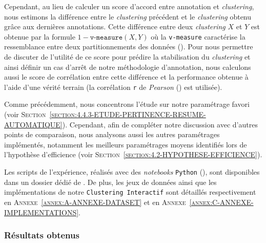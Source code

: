 			Cependant, au lieu de calculer un score d'accord entre annotation et \textit{clustering}, nous estimons la différence entre le \textit{clustering} précédent et le \textit{clustering} obtenu grâce aux dernières annotations.
			Cette différence entre deux \textit{clustering} $X$ et $Y$ est obtenue par la formule $1-\texttt{v-measure}(X,Y)$ où la \texttt{v-measure} caractérise la ressemblance entre deux partitionnements des données (\cite{rosenberg-hirschberg:2007:vmeasure-conditional-entropybased}).
			Pour nous permettre de discuter de l'utilité de ce score pour prédire la stabilisation du \textit{clustering} et ainsi définir un cas d'arrêt de notre méthodologie d'annotation, nous calculons aussi le score de corrélation entre cette différence et la performance obtenue à l'aide d'une vérité terrain (la corrélation \texttt{r} de \textit{Pearson} (\cite{kirch:2008:pearson-correlation-coefficient}) est utilisée).
			
			\begin{leftBarIdea}
				Comme précédemment, nous concentrons l'étude sur notre paramétrage favori (voir \textsc{Section~\ref{section:4.4.3-ETUDE-PERTINENCE-RESUME-AUTOMATIQUE}}).
				Cependant, afin de compléter notre discussion avec d'autres points de comparaison, nous analysons aussi les autres paramétrages implémentés, notamment les meilleurs paramétrages moyens identifiés lors de l'hypothèse d'efficience (voir \textsc{Section~\ref{section:4.2-HYPOTHESE-EFFICIENCE}}).
			\end{leftBarIdea}
			
			\begin{leftBarInformation}
				Les scripts de l'expérience, réalisés avec des \textit{notebooks} \texttt{Python} (\cite{van-rossum-drake:2009:python-reference-manual}), sont disponibles dans un dossier dédié de \cite{schild:2021:cognitivefactory-interactiveclusteringcomparativestudy}.
				De plus, les jeux de données ainsi que les implémentations de notre \texttt{Clustering Interactif} sont détaillés respectivement en \textsc{Annexe~\ref{annex:A-ANNEXE-DATASET}} et en \textsc{Annexe~\ref{annex:C-ANNEXE-IMPLEMENTATIONS}}.
			\end{leftBarInformation}

		\subsubsection{Résultats obtenus}
			
